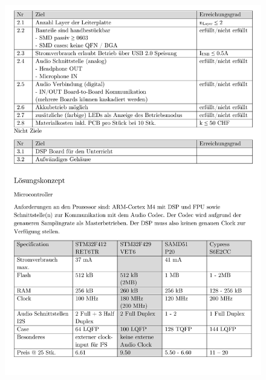 \begin{appendix}
\begin{figure}[h]
	\centering
	\includegraphics[width=0.95\linewidth]{appendix/pflichtenheft (2).pdf}
\end{figure}


\end{appendix}
